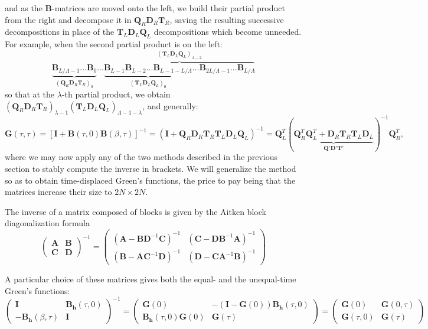 and as the $\bm B$-matrices are moved onto the left, we build their partial product from the right and decompose it in $\bm Q_R \bm D_R \bm T_R$, saving the resulting successive decompositions in place of the $\bm T_L \bm D_L \bm Q_L$ decompositions which become unneeded.
For example, when the second partial product is on the left:
\begin{equation}
\underbrace{\bm B_{L / \Lambda - 1} ...  \bm B_0}_{(\bm Q_R \bm D_R \bm T_R)_{0}} ... \overbrace{ \underbrace{\bm B_{L - 1} \bm B_{L-2} ... \bm B_{L - 1- L / \Lambda}}_{(\bm T_L \bm D_L \bm Q_L)_{0} } ...  \bm B_{2 L / \Lambda -1} ...\bm B_{L / \Lambda} }^{(\bm T_L \bm D_L \bm Q_L)_{\Lambda - 2}} 
\end{equation}
so that at the $\lambda$-th partial product, we obtain $(\bm Q_R \bm D_R \bm T_R )_{\lambda -1} (\bm T_L \bm D_L \bm Q_L )_{\Lambda - 1 - \lambda}$, and generally:
\begin{equation}
\bm G ( \tau, \tau ) = [\bm I + \bm B ( \tau, 0 ) \bm B ( \beta, \tau ) ]^{-1} = ( \bm I + \bm Q_R \bm D_R \bm T_R \bm T_L \bm D_L \bm Q_L )^{-1} = \bm Q_L^T ( \underbrace{\bm Q_R^T \bm Q_L^T + \bm D_R \bm T_R \bm T_L \bm D_L}_{\bm Q' \bm D' \bm T'} )^{-1} \bm Q_R^T ,
\end{equation}
where we may now apply any of the two methods described in the previous section to stably compute the inverse in brackets.
We will generalize the  method so as to obtain time-displaced Green's functions, the price to pay being that the matrices increase their size to $2 N \times 2 N$.

The inverse of a matrix composed of blocks is given by the Aitken block diagonalization formula
\begin{equation}
\begin{pmatrix}
\bm A & \bm B \\
\bm C & \bm D
\end{pmatrix}^{-1}
=
\begin{pmatrix}
( \bm A - \bm B \bm D^{-1} \bm C )^{-1} & ( \bm C - \bm D \bm B^{-1} \bm A )^{-1} \\
( \bm B - \bm A \bm C^{-1} \bm D )^{-1} & ( \bm D - \bm C \bm A^{-1} \bm B )^{-1}
\end{pmatrix}
\end{equation}

A particular choice of these matrices gives both the equal- and the unequal-time Green's functions:
\begin{equation}
\begin{pmatrix}
\bm I & \bm B_{\bm h} (\tau, 0) \\
-\bm B_{\bm h} ( \beta, \tau ) & \bm I
\end{pmatrix}^{-1}
=
\begin{pmatrix}
\bm G ( 0 ) & - ( \bm I - \bm G ( 0 ) ) \bm B_{\bm h} ( \tau, 0 )  \\
\bm B_{\bm h} ( \tau, 0 ) \bm G ( 0 ) & \bm G ( \tau ) 
\end{pmatrix}
=
\begin{pmatrix}
\bm G ( 0 ) & \bm G ( 0, \tau )  \\
\bm G ( \tau, 0 ) & \bm G ( \tau ) 
\end{pmatrix}
\end{equation}

